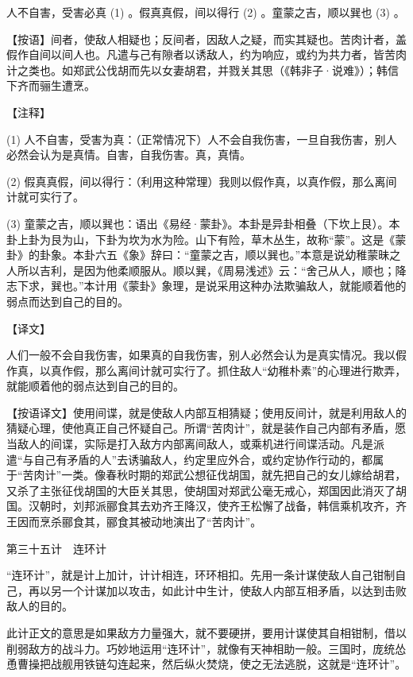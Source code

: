 \documentclass[12pt,UTF8]{ctexbook}
\begin{document}
人不自害，受害必真 (1) 。假真真假，间以得行 (2) 。童蒙之吉，顺以巽也 (3) 。

【按语】间者，使敌人相疑也；反间者，因敌人之疑，而实其疑也。苦肉计者，盖假作自间以间人也。凡遣与己有隙者以诱敌人，约为响应，或约为共力者，皆苦肉计之类也。如郑武公伐胡而先以女妻胡君，并戮关其思（《韩非子·说难》）；韩信下齐而骊生遭烹。





【注释】


(1) 人不自害，受害为真：（正常情况下）人不会自我伤害，一旦自我伤害，别人必然会认为是真情。自害，自我伤害。真，真情。

(2) 假真真假，间以得行：（利用这种常理）我则以假作真，以真作假，那么离间计就可实行了。

(3) 童蒙之吉，顺以巽也：语出《易经·蒙卦》。本卦是异卦相叠（下坎上艮）。本卦上卦为艮为山，下卦为坎为水为险。山下有险，草木丛生，故称“蒙”。这是《蒙卦》的卦象。本卦六五《象》辞曰：“童蒙之吉，顺以巽也。”本意是说幼稚蒙昧之人所以吉利，是因为他柔顺服从。顺以巽，《周易浅述》云：“舍己从人，顺也；降志下求，巽也。”本计用《蒙卦》象理，是说采用这种办法欺骗敌人，就能顺着他的弱点而达到自己的目的。





【译文】


人们一般不会自我伤害，如果真的自我伤害，别人必然会认为是真实情况。我以假作真，以真作假，那么离间计就可实行了。抓住敌人“幼稚朴素”的心理进行欺弄，就能顺着他的弱点达到自己的目的。

【按语译文】使用间谍，就是使敌人内部互相猜疑；使用反间计，就是利用敌人的猜疑心理，使他真正自己怀疑自己。所谓“苦肉计”，就是装作自己内部有矛盾，愿当敌人的间谍，实际是打入敌方内部离间敌人，或乘机进行间谍活动。凡是派遣“与自己有矛盾的人”去诱骗敌人，约定里应外合，或约定协作行动的，都属于“苦肉计”一类。像春秋时期的郑武公想征伐胡国，就先把自己的女儿嫁给胡君，又杀了主张征伐胡国的大臣关其思，使胡国对郑武公毫无戒心，郑国因此消灭了胡国。汉朝时，刘邦派郦食其去劝齐王降汉，使齐王松懈了战备，韩信乘机攻齐，齐王因而烹杀郦食其，郦食其被动地演出了“苦肉计”。





第三十五计　连环计


“连环计”，就是计上加计，计计相连，环环相扣。先用一条计谋使敌人自己钳制自己，再以另一个计谋加以攻击，如此计中生计，使敌人内部互相矛盾，以达到击败敌人的目的。

此计正文的意思是如果敌方力量强大，就不要硬拼，要用计谋使其自相钳制，借以削弱敌方的战斗力。巧妙地运用“连环计”，就像有天神相助一般。三国时，庞统怂恿曹操把战舰用铁链勾连起来，然后纵火焚烧，使之无法逃脱，这就是“连环计”。
\end{document}
